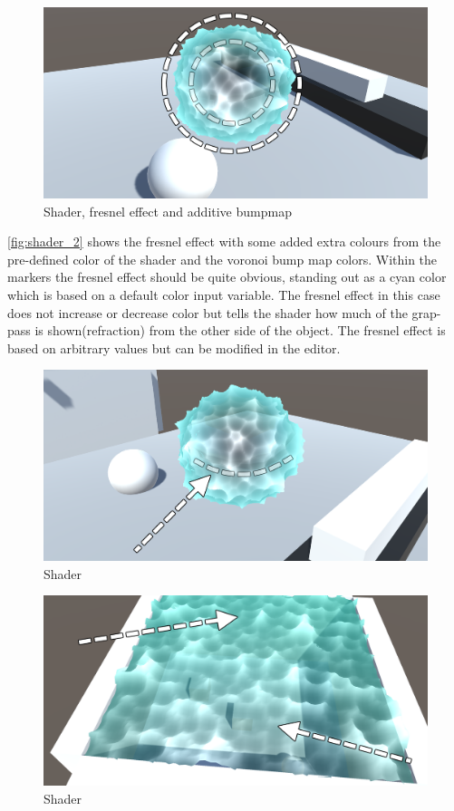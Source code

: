 \documentclass{article}
\begin{document}
\begin{figure}[H]
    \centering
    \includegraphics[width=\textwidth]{img/shader_2}
    \caption{Shader, fresnel effect and additive bumpmap}
    \label{fig:shader_2}
\end{figure}
\autoref{fig:shader_2} shows the fresnel effect with some added extra colours from the pre-defined color of the shader and the voronoi bump map colors. Within the markers the fresnel effect should be quite obvious, standing out as a cyan color which is based on a default color input variable. The fresnel effect in this case does not increase or decrease color but tells the shader how much of the grap-pass is shown(refraction) from the other side of the object. The fresnel effect is based on arbitrary values but can be modified in the editor. %

\begin{figure}[H]
    \centering
    \includegraphics[width=\textwidth]{img/shader_3}
    \caption{Shader}
    \label{fig:shader_3}
\end{figure}
\begin{figure}[H]
    \centering
    \includegraphics[width=\textwidth]{img/shader_4}
    \caption{Shader}
    \label{fig:shader_4}
\end{figure}
\end{document}
